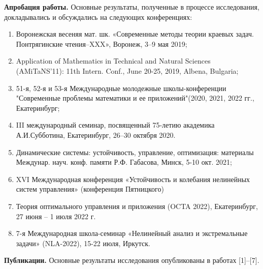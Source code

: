 \documentclass[../main.tex]{subfiles}
\begin{document}
\textbf{Апробация работы.}  Основные результаты, полученные в процессе исследования, докладывались и обсуждались на следующих конференциях:
\begin{enumerate}
	\item Воронежская весеняя мат. шк. «Современные методы теории краевых задач. Понтрягинские чтения–XXX», Воронеж, 3–9 мая 2019;
	\item Application of Mathematics in Technical and Natural Sciences (AMiTaNS’11): 11th Intern. Conf., June 20-25, 2019, Albena, Bulgaria;
	\item 51-я, 52-я и 53-я Международные молодежные школы-конференции "Современные проблемы математики и ее приложений"(2020, 2021, 2022 гг., Екатеринбург;
	\item III международный семинар, посвященный 75-летию академика А.И.Субботина, Екатеринбург, 26–30 октября 2020.
	\item Динамические системы: устойчивость, управление, оптимизация: материалы Междунар. науч. конф. памяти Р.Ф. Габасова, Минск, 5-10 окт. 2021;
	\item XVI Международная конференция «Устойчивость и колебания нелинейных систем управления» (конференция Пятницкого) 
	\item Теория оптимального управления и приложения (OCTA 2022),
Екатеринбург, 27 июня – 1 июля 2022 г.
	\item 7-я Международная школа-семинар  «Нелинейный анализ и экстремальные задачи» (NLA-2022), 15-22 июля, Иркутск.
\end{enumerate}
	
\textbf{Публикации.} Основные результаты исследования опубликованы в работах [1]--[7].
\end{document}
